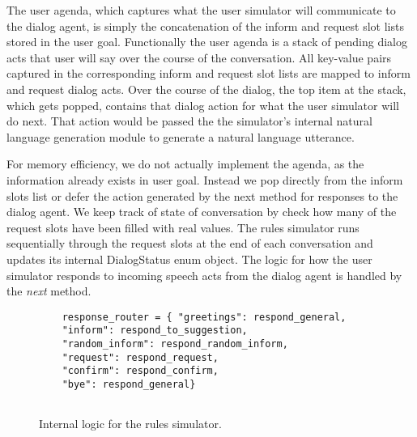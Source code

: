 The user agenda, which captures what the user simulator will communicate to the dialog agent, is simply the concatenation of the inform and request slot lists stored in the user goal. Functionally the user agenda is a stack of pending dialog acts that user will say over the course of the conversation. All key-value pairs captured in the corresponding inform and request slot lists are mapped to inform and request dialog acts. Over the course of the dialog, the top item at the stack, which gets popped, contains that dialog action for what the user simulator will do next. That action would be passed the the simulator's internal natural language generation module to generate a natural language utterance. 

 For memory efficiency, we do not actually implement the agenda, as the information already exists in user goal. Instead we pop directly from the inform slots list or defer the action generated by the next method for responses to the dialog agent. We keep track of state of conversation by check how many of the request slots have been filled with real values. The rules simulator runs sequentially through the request slots at the end of each conversation and updates its internal DialogStatus enum object. The logic for how the user simulator responds to incoming speech acts from the dialog agent is handled by the \textit{next} method.
 
 \begin{figure}[h!]
 	\caption{ Internal logic for the rules simulator. }
 	\label{fig:ex_user_goal}
 	\begin{lstlisting}
 	response_router = { "greetings": respond_general,
 	"inform": respond_to_suggestion,
 	"random_inform": respond_random_inform,
 	"request": respond_request,
 	"confirm": respond_confirm,
 	"bye": respond_general}
 	
 	\end{lstlisting}
 \end{figure}

